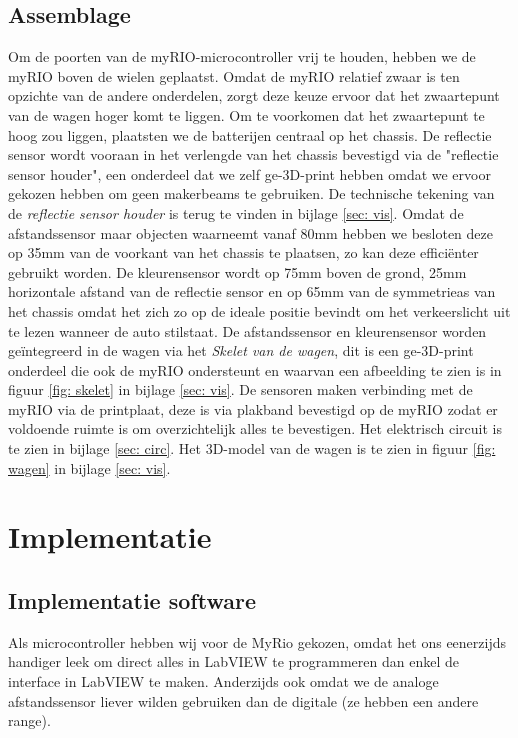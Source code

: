 \documentclass[a4paper,twoside,kulak]{kulakreport}
\begin{document}
	\subsection{Assemblage}
	Om de poorten van de myRIO-microcontroller vrij te houden, hebben we de myRIO boven de wielen geplaatst. Omdat de myRIO relatief zwaar is ten opzichte van de andere onderdelen, zorgt deze keuze ervoor dat het zwaartepunt van de wagen hoger komt te liggen. Om te voorkomen dat het zwaartepunt te hoog zou liggen, plaatsten we de batterijen centraal op het chassis. De reflectie sensor wordt vooraan in het verlengde van het chassis bevestigd via de "reflectie sensor houder", een onderdeel dat we zelf ge-3D-print hebben omdat we ervoor gekozen hebben om geen makerbeams te gebruiken. De technische tekening van de \textit{reflectie sensor houder} is terug te vinden in bijlage \ref{sec: vis}. Omdat de afstandssensor maar objecten waarneemt vanaf 80mm hebben we besloten deze op 35mm van de voorkant van het chassis te plaatsen, zo kan deze efficiënter gebruikt worden. De kleurensensor wordt op 75mm boven de grond, 25mm horizontale afstand van de reflectie sensor en op 65mm van de symmetrieas van het chassis omdat het zich zo op de ideale positie bevindt om het verkeerslicht uit te lezen wanneer de auto stilstaat. De afstandssensor en kleurensensor worden geïntegreerd in de wagen via het \textit{Skelet van de wagen}, dit is een ge-3D-print onderdeel die ook de myRIO ondersteunt en waarvan een afbeelding te zien is in figuur \ref{fig: skelet} in bijlage \ref{sec: vis}. De sensoren maken verbinding met de myRIO via de printplaat, deze is via plakband bevestigd op de myRIO zodat er voldoende ruimte is om overzichtelijk alles te bevestigen. Het elektrisch circuit is te zien in bijlage \ref{sec: circ}. Het 3D-model van de wagen is te zien in figuur \ref{fig: wagen} in bijlage \ref{sec: vis}.
	
	
	\section{Implementatie}

	\subsection{Implementatie software}
	Als microcontroller hebben wij voor de MyRio gekozen, omdat het ons eenerzijds handiger leek om direct alles in LabVIEW te programmeren dan enkel de interface in LabVIEW te maken. Anderzijds ook omdat we de analoge afstandssensor liever wilden gebruiken dan de digitale (ze hebben een andere range).
	
\end{document}
